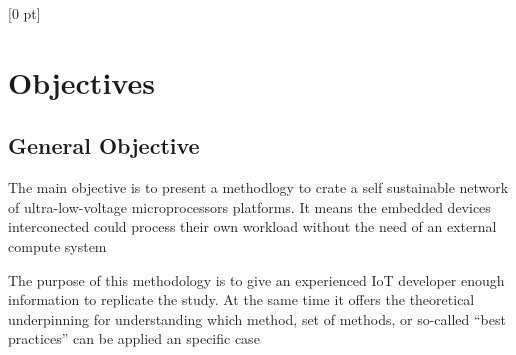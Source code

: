 \titlespacing{\chapter}{0 pt}{30 pt}{50 pt}[0 pt]
\titleformat{\section}{\Large\bfseries}{\thesection}{0 pt}{\hspace{30 pt}}
\titleformat{\subsection}{\large\bfseries}{\thesubsection}{0 pt}{\hspace{30 pt}}
\pagestyle{fancy}
\fancyhead[LO,LE]{\footnotesize\textit{\leftmark}}
\fancyhead[RO,RE]{\thepage}
\fancyfoot[CO,CE]{}

\chapter{Objectives} %

\normalsize

\section{General Objective}
\noindent

The main objective is to present a methodlogy to crate a self sustainable
network of ultra-low-voltage microprocessors platforms. It means the embedded 
devices interconected could process their own workload without the need of an 
external compute system

The purpose of this methodology is to give an experienced IoT  developer 
enough information to replicate the study. At the same time it offers the theoretical 
underpinning for understanding which method, set of methods, or so-called “best 
practices” can be applied an specific case


